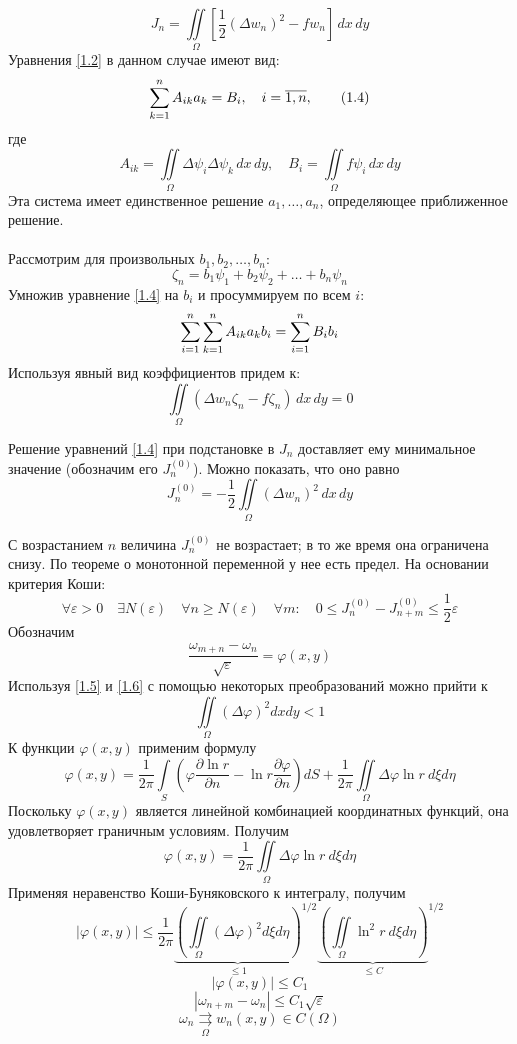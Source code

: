 \[
J_n = \iint\limits_{\Omega} \left[ \frac{1}{2} (\Delta w_n)^2 - f w_n \right] \, dx \, dy
\]
Уравнения \eqref{1.2} в данном случае имеют вид:
\[
\sum\limits_{k=1}^n A_{ik} a_k = B_i, \quad i = \overline{1,n},
\tag{1.4}
\label{1.4}
\]
где
\[
A_{ik} = \iint\limits_{\Omega} \Delta \psi_i \Delta \psi_k \, dx \, dy, \quad B_i = \iint\limits_{\Omega} f \psi_i \, dx \, dy
\]
Эта система имеет единственное решение \( a_1, \ldots, a_n \), определяющее приближенное решение. \\ \\
Рассмотрим для произвольных \( b_1, b_2, \ldots, b_n \):
\[
\zeta_n = b_1 \psi_1 + b_2 \psi_2 + \ldots + b_n \psi_n
\]
Умножив уравнение \eqref{1.4} на \( b_i \) и просуммируем по всем \( i \):
\[
\sum\limits_{i=1}^n \sum\limits_{k=1}^n A_{ik} a_k b_i = \sum\limits_{i=1}^n B_i b_i
\]
Используя явный вид коэффициентов придем к:
\[
\iint\limits_{\Omega} (\Delta w_n \zeta_n - f \zeta_n) \, dx \, dy = 0
\tag{1.5}
\label{1.5}
\]

Решение уравнений \eqref{1.4} при подстановке в \( J_n \) доставляет ему минимальное значение (обозначим его \( J_n^{(0)} \)). Можно показать, что оно равно
\[
J_n^{(0)} = -\frac{1}{2} \iint\limits_{\Omega} (\Delta w_n)^2 \, dx \, dy
\]

С возрастанием \( n \) величина \( J_n^{(0)} \) не возрастает; в то же время она ограничена снизу. По теореме о монотонной переменной у нее есть предел. На основании критерия Коши:
\[
\forall \varepsilon >0 \quad \exists N(\varepsilon) \quad \forall n \geq N(\varepsilon) \quad \forall m: \quad 0 \leq J_n^{(0)} - J_{n+m}^{(0)} \leq \frac{1}{2} \varepsilon
\tag{1.6}
\label{1.6}
\]
Обозначим
\[
\frac{\omega_{m+n} - \omega_n}{\sqrt{\varepsilon}} = \varphi (x,y)
\]
Используя \eqref{1.5} и \eqref{1.6} с помощью некоторых преобразований можно прийти к 
\[
\iint\limits_{\Omega}{(\Delta \varphi)}^2 dx dy < 1
\]
К функции \( \varphi (x, y) \) применим формулу
\[
\varphi (x,y) = \frac{1}{2\pi}\int\limits_S \left( \varphi \frac{\partial \ln r}{\partial n} - \ln r \frac{\partial  \varphi}{\partial n} \right) dS + \frac{1}{2 \pi} \iint\limits_{\Omega} \Delta \varphi \ln r \ d\xi d \eta
\]
Поскольку \( \varphi (x, y) \) является линейной комбинацией координатных функций, она удовлетворяет граничным условиям. Получим
\[
\varphi (x,y) = \frac{1}{2 \pi} \iint\limits_{\Omega} \Delta \varphi \ln r \ d\xi d \eta
\]
Применяя неравенство Коши-Буняковского к интегралу, получим
\[
|\varphi (x,y)| \leq \frac{1}{2\pi}{ \underbrace{\left( \iint\limits_{\Omega} {(\Delta \varphi)}^2 d \xi d \eta \right)}_{\leq 1} }^{1/2} { \underbrace{\left( \iint\limits_{\Omega}{\ln}^2 r \ d\xi d\eta \right)}_{\leq C} }^{1/2}
\]
\[
|\varphi (x,y)| \leq C_1
\]
\[ |\omega_{n+m} - \omega_{n} | \leq C_1 \sqrt{\varepsilon} \]
\[ \omega_n \underset{\Omega}{\rightrightarrows}  w_n(x,y) \in C(\Omega) \]

\newpage